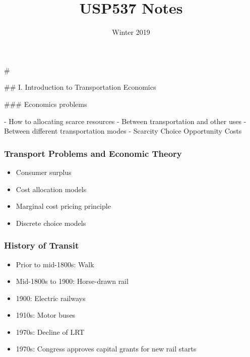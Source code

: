 \documentclass[]{article}
\title{USP537 Notes}
\author{}
\date{Winter 2019}
\providecommand{\tightlist}{%
  \setlength{\itemsep}{0pt}\setlength{\parskip}{0pt}}
\begin{document}
\maketitle

\begin{multicols}{3}

#  

## I. Introduction to Transportation Economics

### Economics problems



 - How to allocating scarce resources  
 - Between transportation and other uses  
 - Between different transportation modes  
 - Scarcity Choice Opportunity Costs  
 
\end{multicols}

\hypertarget{transport-problems-and-economic-theory}{%
\subsubsection{Transport Problems and Economic
Theory}\label{transport-problems-and-economic-theory}}

\begin{itemize}
\tightlist
\item
  Consumer surplus\\
\item
  Cost allocation models\\
\item
  Marginal cost pricing principle\\
\item
  Discrete choice models
\end{itemize}

\hypertarget{history-of-transit}{%
\subsubsection{History of Transit}\label{history-of-transit}}

\begin{itemize}
\tightlist
\item
  Prior to mid-1800s: Walk
\item
  Mid-1800s to 1900: Horse-drawn rail
\item
  1900: Electric railways
\item
  1910s: Motor buses
\item
  1970s: Decline of LRT
\item
  1970s: Congress approves capital grants for new rail starts
\end{itemize}
\end{document}
